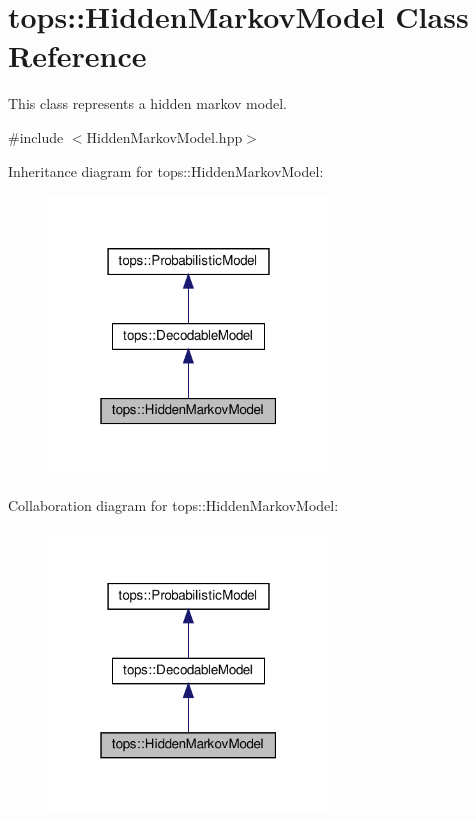 \hypertarget{classtops_1_1HiddenMarkovModel}{}\section{tops\+:\+:Hidden\+Markov\+Model Class Reference}
\label{classtops_1_1HiddenMarkovModel}


This class represents a hidden markov model.  




{\ttfamily \#include $<$Hidden\+Markov\+Model.\+hpp$>$}



Inheritance diagram for tops\+:\+:Hidden\+Markov\+Model\+:
\nopagebreak
\begin{figure}[H]
\begin{center}
\leavevmode
\includegraphics[width=211pt]{classtops_1_1HiddenMarkovModel__inherit__graph}
\end{center}
\end{figure}


Collaboration diagram for tops\+:\+:Hidden\+Markov\+Model\+:
\nopagebreak
\begin{figure}[H]
\begin{center}
\leavevmode
\includegraphics[width=211pt]{classtops_1_1HiddenMarkovModel__coll__graph}
\end{center}
\end{figure}
